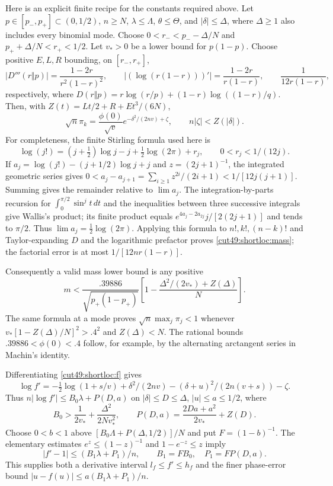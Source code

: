 \documentclass[11pt,a4paper]{article}
\numberwithin{equation}{section}
\theoremstyle{definition}
\theoremstyle{remark}
\begin{document}
Here is an explicit finite recipe for the constants required above.
Let $p\in[p_-,p_+]\subset(0,1/2)$, $n\ge N$, $\lambda\le\Lambda$,
$\theta\le\Theta$, and $|\delta|\le\Delta$, where $\Delta\ge1$ also includes
every binomial mode. Choose $0<r_-<p_- -\Delta/N$ and
$p_++\Delta/N<r_+<1/2$. Let $v_*>0$ be a lower bound for $p(1-p)$.
Choose positive $E,L,R$ bounding, on $[r_-,r_+]$,
\[
 |D'''(r\Vert p)|=\frac{1-2r}{r^2(1-r)^2},\qquad
 |(\log(r(1-r)))'|=\frac{1-2r}{r(1-r)},\qquad
 \frac1{12r(1-r)},
\]
respectively, where $D(r\Vert p)=r\log(r/p)+(1-r)\log((1-r)/q)$.
Then, with $Z(t)=Lt/2+R+Et^3/(6N)$,
\begin{equation}\label{cut49:shortloc:mass}
 \sqrt n\pi_k=\frac{\phi(0)}{\sqrt v}
       e^{-\delta^2/(2nv)+\zeta},\qquad n|\zeta|<Z(|\delta|).
\end{equation}
For completeness, the finite Stirling formula used here is
\[
 \log(j!)=(j+\tfrac12)\log j-j+\tfrac12\log(2\pi)+r_j,
 \qquad 0<r_j<1/(12j).
\]
If $a_j=\log(j!)-(j+1/2)\log j+j$ and $z=(2j+1)^{-1}$, the integrated
geometric series gives
$0<a_j-a_{j+1}=\sum_{i\ge1}z^{2i}/(2i+1)<1/[12j(j+1)]$.
Summing gives the remainder relative to $\lim a_j$. The integration-by-parts
recursion for $\int_0^{\pi/2}\sin^j t\,dt$ and the inequalities between three
successive integrals give Wallis's product; its finite product equals
$e^{4a_j-2a_{2j}}j/[2(2j+1)]$ and tends to $\pi/2$. Thus
$\lim a_j=\tfrac12\log(2\pi)$. Applying this formula to $n!,k!,(n-k)!$
and Taylor-expanding $D$ and the logarithmic prefactor proves
\eqref{cut49:shortloc:mass}; the factorial error is at most $1/[12nr(1-r)]$.

Consequently a valid mass lower bound is any positive
\begin{equation}\label{cut49:shortloc:m}
 m<\frac{.39886}{\sqrt{p_+(1-p_+)}}
          \left[1-\frac{\Delta^2/(2v_*)+Z(\Delta)}N\right].
\end{equation}
The same formula at a mode proves $\sqrt n\max_j\pi_j<1$ whenever
$v_*[1-Z(\Delta)/N]^2>.4^2$ and $Z(\Delta)<N$.
The rational bounds $.39886<\phi(0)<.4$ follow, for example, by the
alternating arctangent series in Machin's identity.

Differentiating \eqref{cut49:shortloc:f} gives
\begin{equation}\label{cut49:shortloc:logder}
 \log f'=-\tfrac12\log(1+s/v)+\delta^2/(2nv)
                   -(\delta+u)^2/(2n(v+s))-\zeta.
\end{equation}
Thus $n|\log f'|\le B_0\lambda+P(D,a)$ on $|\delta|\le D\le\Delta$,
$|u|\le a\le1/2$, where
\[
 B_0>\frac1{2v_*}+\frac{\Delta^2}{2Nv_*^2},\qquad
 P(D,a)=\frac{2Da+a^2}{2v_*}+Z(D).
\]
Choose $0<b<1$ above $[B_0\Lambda+P(\Delta,1/2)]/N$ and put
$F=(1-b)^{-1}$. The elementary estimates $e^z\le(1-z)^{-1}$ and
$1-e^{-z}\le z$ imply
\begin{equation}\label{cut49:shortloc:derivative}
 |f'-1|\le(B_1\lambda+P_1)/n,\qquad B_1=FB_0,\quad P_1=FP(D,a).
\end{equation}
This supplies both a derivative interval $l_f\le f'\le h_f$ and the
finer phase-error bound $|u-f(u)|\le a(B_1\lambda+P_1)/n$.
\end{document}
